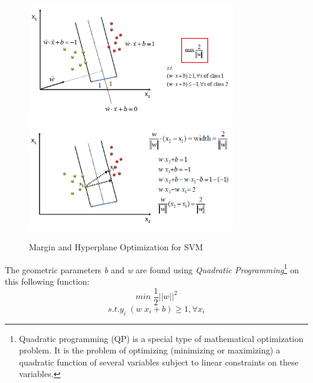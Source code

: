 \
\begin{figure}[H]
    \centering
    \includegraphics[width=0.8\textwidth]{fig/hypopt1.png}
    \includegraphics[width=0.8\textwidth]{fig/hypopt2.png}
    \caption[Short caption]{Margin and Hyperplane Optimization for SVM}
    \label{fig:hypopt}
\end{figure}

The geometric parameters \emph{b} and \emph{w} are found using \emph{Quadratic Programming}\footnote{Quadratic programming (QP) is a special type of mathematical optimization problem. It is the problem of optimizing (minimizing or maximizing) a quadratic function of several variables subject to linear constraints on these variables.} on this following function:
\begin{equation*}
min \; \frac{1}{2} ||w||^2 
\end{equation*}
\begin{equation*}
s.t. y_i \; (w \; x_i + b) \geq 1, \forall x_i
\end{equation*}